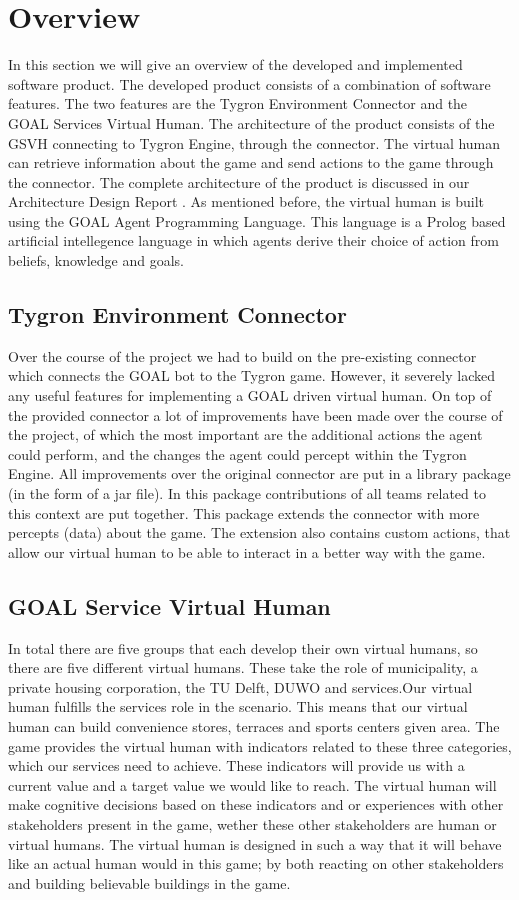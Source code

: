 \section{Overview}
In this section we will give an overview of the developed and implemented software product. The developed product consists of a combination of software features. The two features are the Tygron Environment Connector  and the GOAL Services Virtual Human. The architecture of the product consists of the GSVH connecting to Tygron Engine, through the connector. The virtual human can retrieve information about the game and send actions to the game through the connector. The complete architecture of the product is discussed in our Architecture Design Report \cite{CTD16}. As mentioned before, the virtual human is built using the GOAL Agent Programming Language\cite{GOAL16}. This language is a Prolog based artificial intellegence language in which agents derive their choice of action from beliefs, knowledge and goals.

\subsection{Tygron Environment Connector}
Over the course of the project we had to build on the pre-existing connector which connects the GOAL bot to the Tygron game. However, it severely lacked any useful features for implementing a GOAL driven virtual human. On top of the provided connector a lot of improvements have been made over the course of the project, of which the most important are the additional actions the agent could perform, and the changes the agent could percept within the Tygron Engine. All improvements over the original connector are put in a library package (in the form of a jar file). In this package contributions of all teams related to this context are put together. This package extends the connector with more percepts (data) about the game. The extension also contains custom actions, that allow our virtual human to be able to interact in a better way with the game. 

\subsection{GOAL Service Virtual Human}
In total there are five groups that each develop their own virtual humans, so there are five different virtual humans. These take the role of municipality, a private housing corporation, the TU Delft, DUWO and services.Our virtual human fulfills the services role in the scenario. This means that our virtual human can build convenience stores, terraces and sports centers given area. The game provides the virtual human with indicators related to these three categories, which our services need to achieve. These indicators will provide us with a current value and a target value we would like to reach. The virtual human will make cognitive decisions based on these indicators and or experiences with other stakeholders present in the game, wether these other stakeholders are human or virtual humans. The virtual human is designed in such a way that it will behave like an actual human would in this game; by both reacting on other stakeholders and building believable buildings in the game.

\newpage

